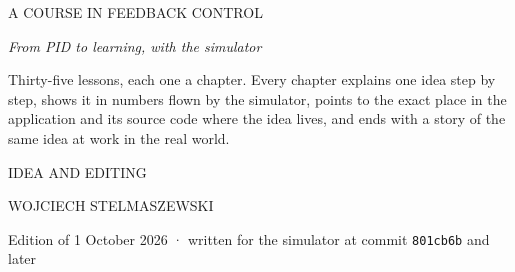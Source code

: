 \thispagestyle{empty}
\begin{center}
\vspace*{34mm}
{\sanscaps{}\small\color{accent}A COURSE IN FEEDBACK CONTROL}\par\vspace{9mm}
{\sansdisplay{}\fontsize{44}{48}\selectfont \greektitle}\par\vspace{6mm}
{\displayserif\itshape\fontsize{13}{18}\selectfont\color{muted} From PID to learning, with the simulator}\par
\vspace{26mm}
\begin{minipage}{112mm}\centering\sffamily\small\color{muted}\linespread{1.2}\selectfont
Thirty-five lessons, each one a chapter. Every chapter explains one idea step by step, shows it in
numbers flown by the simulator, points to the exact place in the application and its source code
where the idea lives, and ends with a story of the same idea at work in the real world.
\end{minipage}\par
\vspace{30mm}
{\sanscaps{}\scriptsize\color{muted}IDEA AND EDITING}\par\vspace{2.5mm}
{\sansdisplay{}\fontsize{17}{20}\selectfont WOJCIECH STELMASZEWSKI}\par
\vfill
{\sffamily\footnotesize\color{faint}Edition of 1 October 2026 · written for the simulator at commit \texttt{801cb6b} and later}
\end{center}
\clearpage

